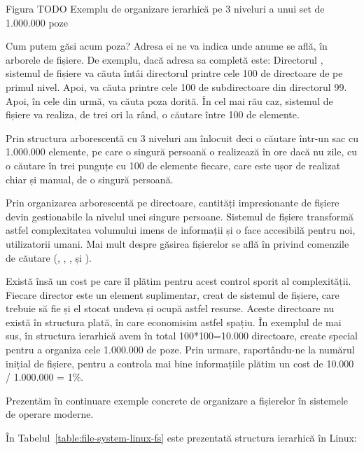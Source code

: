 Figura TODO Exemplu de organizare ierarhică pe 3 niveluri a unui set de 1.000.000
poze

Cum putem găsi acum poza? Adresa ei ne va indica unde anume se află, în arborele
de fișiere. De exemplu, dacă adresa sa completă este: Directorul
, sistemul de fișiere va căuta
întâi directorul  printre cele 100 de directoare de pe primul nivel. Apoi, va
căuta  printre cele 100 de subdirectoare din directorul 99.
Apoi, în cele din urmă, va căuta poza dorită. În cel mai rău caz, sistemul de
fișiere va realiza, de trei ori la rând, o căutare între 100 de elemente.

Prin structura arborescentă cu 3 niveluri am înlocuit deci o căutare într-un sac
cu 1.000.000 elemente, pe care o singură persoană o realizează în ore dacă nu
zile, cu o căutare în trei punguțe cu 100 de elemente fiecare, care este ușor de
realizat chiar și manual, de o singură persoană.

Prin organizarea arborescentă pe directoare, cantități impresionante de fișiere
devin gestionabile la nivelul unei singure persoane. Sistemul de fișiere
transformă astfel complexitatea volumului imens de informații și o face
accesibilă pentru noi, utilizatorii umani. Mai mult despre găsirea fișierelor
se află în  privind
comenzile de căutare (, , ,  și
).

Există însă un cost pe care îl plătim pentru acest control sporit al
complexității. Fiecare director este un element suplimentar, creat de sistemul
de fișiere, care trebuie să fie și el stocat undeva și ocupă astfel resurse.
Aceste directoare nu există în structura plată, în care economisim astfel
spațiu. În exemplul de mai sus, în structura ierarhică avem în total
100*100=10.000 directoare, create special pentru a organiza cele 1.000.000 de
poze. Prin urmare, raportându-ne la numărul inițial de fișiere, pentru a
controla mai bine informațiile plătim un cost de 10.000 / 1.000.000 = 1\%.

Prezentăm în continuare exemple concrete de organizare a fișierelor în sistemele de operare moderne.

În Tabelul~\ref{table:file-system-linux-fs} este prezentată structura ierarhică în Linux:

